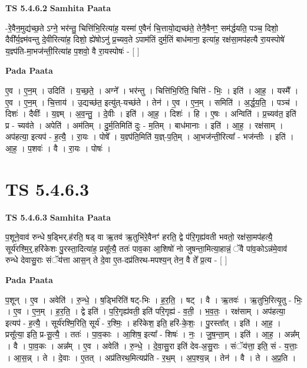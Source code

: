 \documentclass[17pt]{extarticle}
\begin{document}
\textbf{TS 5.4.6.2 } \newline
\textbf{Samhita Paata} \newline

-रे॒वैन॒मुद्य॑च्छ॒ते ऽग्ने॒ भर॑न्तु॒ चित्ति॑भि॒रित्या॑ह॒ यस्मा॑ ए॒वैनं॑ चि॒त्तायो॒द्यच्छ॑ते॒ तेनै॒वैनꣳ॒॒ सम॑र्द्धयति॒ पञ्च॒ दिशो॒ दैवी᳚र्य॒ज्ञ्म॑वन्तु दे॒वीरित्या॑ह॒ दिशो॒ ह्ये॑षोऽनु॑ प्र॒च्यव॒ते ऽपाम॑तिं दुर्म॒तिं बाध॑माना॒ इत्या॑ह॒ रक्ष॑सा॒मप॑हत्यै रा॒यस्पोषे॑ य॒ज्ञ्प॑ति-मा॒भज॑न्ती॒रित्या॑ह प॒शवो॒ वै रा॒यस्पोषः॑ - [  ] \newline

\textbf{Pada Paata} \newline

ए॒व । ए॒न॒म् । उदिति॑ । य॒च्छ॒ते॒ । अग्ने᳚ । भर॑न्तु । चित्ति॑भि॒रिति॒ चित्ति॑ - भिः॒ । इति॑ । आ॒ह॒ । यस्मै᳚ । ए॒व । ए॒न॒म् । चि॒त्ताय॑ । उ॒द्यच्छ॑त॒ इत्यु॑त्-यच्छ॑ते । तेन॑ । ए॒व । ए॒न॒म् । समिति॑ । अ॒र्द्ध॒य॒ति॒ । पञ्च॑ । दिशः॑ । दैवीः᳚ । य॒ज्ञ्म् । अ॒व॒न्तु॒ । दे॒वीः । इति॑ । आ॒ह॒ । दिशः॑ । हि । ए॒षः । अन्विति॑ । प्र॒च्यव॑त॒ इति॑ प्र - च्यव॑ते । अपेति॑ । अम॑तिम् । दु॒र्म॒तिमिति॑ दुः - म॒तिम् । बाध॑मानाः । इति॑ । आ॒ह॒ । रक्ष॑साम् । अप॑हत्या॒ इत्यप॑ - ह॒त्यै॒ । रा॒यः । पोषे᳚ । य॒ज्ञ्प॑ति॒मिति॑ य॒ज्ञ्-प॒ति॒म् । आ॒भज॑न्ती॒रित्या᳚ - भज॑न्तीः । इति॑ । आ॒ह॒ । प॒शवः॑ । वै । रा॒यः । पोषः॑ ।  \newline




\section*{ TS 5.4.6.3 }

\textbf{TS 5.4.6.3 } \newline
\textbf{Samhita Paata} \newline

प॒शूने॒वाव॑ रुन्धे ष॒ड्भिर्.ह॑रति॒ षड् वा ऋ॒तव॑ ऋ॒तुभि॑रे॒वैनꣳ॑ हरति॒ द्वे प॑रि॒गृह्य॑वती भवतो॒ रक्ष॑सा॒मप॑हत्यै॒ सूर्य॑रश्मि॒र्॒.हरि॑केशः पु॒रस्ता॒दित्या॑ह॒ प्रसू᳚त्यै॒ ततः॑ पाव॒का आ॒शिषो॑ नो जुषन्ता॒मित्या॒हान्नं॒ ॅवै पा॑व॒कोऽन्न॑मे॒वाव॑ रुन्धे देवासु॒राः संॅय॑त्ता आस॒न् ते दे॒वा ए॒त-दप्र॑तिरथ-मपश्य॒न् तेन॒ वै ते᳚ प्र॒त्य - [  ] \newline

\textbf{Pada Paata} \newline

प॒शून् । ए॒व । अवेति॑ । रु॒न्धे॒ । ष॒ड्भिरिति॑ षट्-भिः । ह॒र॒ति॒ । षट् । वै । ऋ॒तवः॑ । ऋ॒तुभि॒रित्यृ॒तु - भिः॒ । ए॒व । ए॒न॒म् । ह॒र॒ति॒ । द्वे इति॑ । प॒रि॒गृह्य॑वती॒ इति॑ परि॒गृह्य॑ - व॒ती॒ । भ॒व॒तः॒ । रक्ष॑साम् । अप॑हत्या॒ इत्यप॑ - ह॒त्यै॒ । सूर्य॑रश्मि॒रिति॒ सूर्य॑ - र॒श्मिः॒ । हरि॑केश॒ इति॒ हरि॑-के॒शः॒ । पु॒रस्ता᳚त् । इति॑ । आ॒ह॒ । प्रसू᳚त्या॒ इति॒ प्र-सू॒त्यै॒ । ततः॑ । पा॒व॒काः । आ॒शिष॒ इत्या᳚ - शिषः॑ । नः॒ । जु॒ष॒न्ता॒म् । इति॑ । आ॒ह॒ । अन्न᳚म् । वै । पा॒व॒कः । अन्न᳚म् । ए॒व । अवेति॑ । रु॒न्धे॒ । दे॒वा॒सु॒रा इति॑ देव-अ॒सु॒राः । संॅय॑त्ता॒ इति॒ सं - य॒त्ताः॒ । आ॒स॒न्न् । ते । दे॒वाः । ए॒तत् । अप्र॑तिरथ॒मित्यप्र॑ति - र॒थ॒म् । अ॒प॒श्य॒न्न् । तेन॑ । वै । ते । अ॒प्र॒ति ।  \newline
\end{document}
